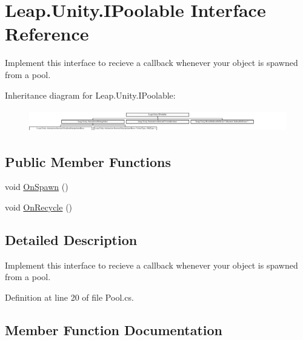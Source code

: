 \hypertarget{interface_leap_1_1_unity_1_1_i_poolable}{}\section{Leap.\+Unity.\+I\+Poolable Interface Reference}
\label{interface_leap_1_1_unity_1_1_i_poolable}


Implement this interface to recieve a callback whenever your object is spawned from a pool.  


Inheritance diagram for Leap.\+Unity.\+I\+Poolable\+:\begin{figure}[H]
\begin{center}
\leavevmode
\includegraphics[height=0.992908cm]{interface_leap_1_1_unity_1_1_i_poolable}
\end{center}
\end{figure}
\subsection*{Public Member Functions}
\begin{DoxyCompactItemize}
\item 
void \mbox{\hyperlink{interface_leap_1_1_unity_1_1_i_poolable_af2e9cf2345aeddf586f7e86fa8301442}{On\+Spawn}} ()
\item 
void \mbox{\hyperlink{interface_leap_1_1_unity_1_1_i_poolable_ad509738b2480f85d435b41d05d172bfe}{On\+Recycle}} ()
\end{DoxyCompactItemize}


\subsection{Detailed Description}
Implement this interface to recieve a callback whenever your object is spawned from a pool. 



Definition at line 20 of file Pool.\+cs.



\subsection{Member Function Documentation}
\mbox{\label{interface_leap_1_1_unity_1_1_i_poolable_ad509738b2480f85d435b41d05d172bfe}} 
